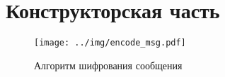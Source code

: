 \section{Конструкторская часть}

\begin{figure}[!htb]\centering
	\texttt{[image: ../img/encode\_msg.pdf]}
	\caption{Алгоритм шифрования сообщения}
	\label{img:encode_msg}
\end{figure}
